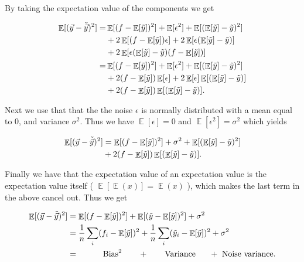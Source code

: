 \documentclass[norsk,a4paper,12pt]{scrartcl}
\DeclareMathOperator*{\E}{\mathbb{E}}
\begin{document}
By taking the expectation value of the components we get

\begin{equation*}
    \begin{aligned}
    \E [ (\Vec{y} - \Tilde{\Vec{y}})^2] = &\E[(f-\E[\Tilde{y}])^2] + \E[\epsilon^2] +\E[( \E[\Tilde{y}] - \Tilde{y} )^2] \\
    &+ 2\E[(f-\E[\Tilde{y}])\epsilon] + 2\E[\epsilon(\E[\Tilde{y}] - \Tilde{y})] \\
    &+ 2\E[\epsilon(\E[\Tilde{y}] - \Tilde{y})(f-\E[\Tilde{y}])] \\
    = &\E[(f-\E[\Tilde{y}])^2] + \E[\epsilon^2] + \E[( \E[\Tilde{y}] - \Tilde{y} )^2] \\
    &+ 2(f-\E[\Tilde{y}])\E[\epsilon]  + 2\E[\epsilon]\E[( \E[\Tilde{y}] - \Tilde{y} )] \\
    &+ 2(f-\E[\Tilde{y}])\E[( \E[\Tilde{y}] - \Tilde{y} )].
    \end{aligned}
\end{equation*}

Next we use that that the the noise $\epsilon$ is normally distributed with a mean equal to 0, and variance $\sigma^2$. Thus we have $\E[\epsilon] = 0$ and $\E[\epsilon^2] = \sigma^2$ which yields

\begin{equation*}
    \begin{aligned}
    \E [ (\Vec{y} - \Tilde{\Vec{y}})^2] &= \E[(f-\E[\Tilde{y}])^2] + \sigma^2  +\E[( \E[\Tilde{y}] - \Tilde{y} )^2] \\
    &+ 2(f-\E[\Tilde{y}])\E[( \E[\Tilde{y}] - \Tilde{y} )].
    \end{aligned}
\end{equation*}

Finally we have that the expectation value of an expectation value is the expectation value itself ( $\E[\E(x)] = \E(x)$ ), which makes the last term in the above cancel out. Thus we get 

\begin{equation}
\begin{aligned}
    \E [ (\Vec{y} - \Tilde{\Vec{y}})^2] &= \E[(f-\E[\Tilde{y}])^2]  +\E[(\Tilde{y} - \E[\Tilde{y}] )^2] + \sigma^2 \\
    &= \frac{1}{n} \sum_{i}(f_i-\E[\Tilde{y}])^2 + \frac{1}{n} \sum_{i} (\Tilde{y}_i - \E[\Tilde{y}] )^2 + \sigma^2 \\
    &= \qquad \ \ \ \text{Bias}^2 \qquad   + \qquad \text{Variance} \quad \ \  + \ \text{Noise variance}.
\end{aligned}
\end{equation}
\end{document}
